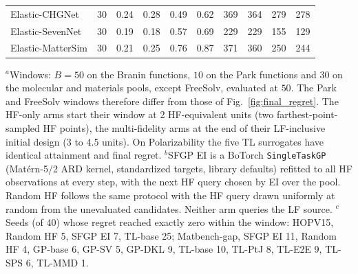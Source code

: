 \begin{table}[p]
\begin{tabular}{@{}lc cccc cccc@{}}
Elastic-CHGNet & 30 & 0.24 & 0.28 & 0.49 & 0.62 & 369 & 364 & 279 & 278 \\
Elastic-SevenNet & 30 & 0.19 & 0.18 & 0.57 & 0.69 & 229 & 229 & 155 & 129 \\
Elastic-MatterSim & 30 & 0.21 & 0.25 & 0.76 & 0.87 & 371 & 360 & 250 & 244 \\
\bottomrule
\end{tabular}
\par\smallskip
{\scriptsize
$^{a}$Windows: $B = 50$ on the Branin functions, $10$ on the Park functions and $30$ on the molecular and materials pools, except FreeSolv, evaluated at $50$. The Park and FreeSolv windows therefore differ from those of Fig.~\ref{fig:final_regret}. The HF-only arms start their window at 2 HF-equivalent units (two farthest-point-sampled HF points), the multi-fidelity arms at the end of their LF-inclusive initial design (3 to 4.5 units). On Polarizability the five TL surrogates have identical attainment and final regret.
$^{b}$SFGP EI is a BoTorch \texttt{SingleTaskGP} (Mat\'{e}rn-5/2 ARD kernel, standardized targets, library defaults) refitted to all HF observations at every step, with the next HF query chosen by EI over the pool. Random HF follows the same protocol with the HF query drawn uniformly at random from the unevaluated candidates. Neither arm queries the LF source.
$^{c}$Seeds (of 40) whose regret reached exactly zero within the window: HOPV15, Random HF 5, SFGP EI 7, TL-base 25; Matbench-gap, SFGP EI 11, Random HF 4, GP-base 6, GP-SV 5, GP-DKL 9, TL-base 10, TL-PtJ 8, TL-E2E 9, TL-SPS 6, TL-MMD 1.
}
\end{table}

